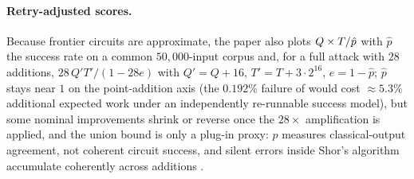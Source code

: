 \paragraph{Retry-adjusted scores.} Because frontier circuits are approximate, the paper also plots $Q\times T/\hat p$ with $\hat p$ the success rate on a common $50{,}000$-input corpus and, for a full attack with $28$ additions, $28\,Q'T'/(1-28e)$ with $Q'=Q+16$, $T'=T+3\cdot2^{16}$, $e=1-\hat p$; $\hat p$ stays near $1$ on the point-addition axis (the $0.192\%$ failure of  would cost $\approx5.3\%$ additional expected work under an independently re-runnable success model), but some nominal improvements shrink or reverse once the $28\times$ amplification is applied, and the union bound is only a plug-in proxy: $\hat p$ measures classical-output agreement, not coherent circuit success, and silent errors inside Shor's algorithm accumulate coherently across additions \cite{ecdsafail26,ecdsafail-supp}.

